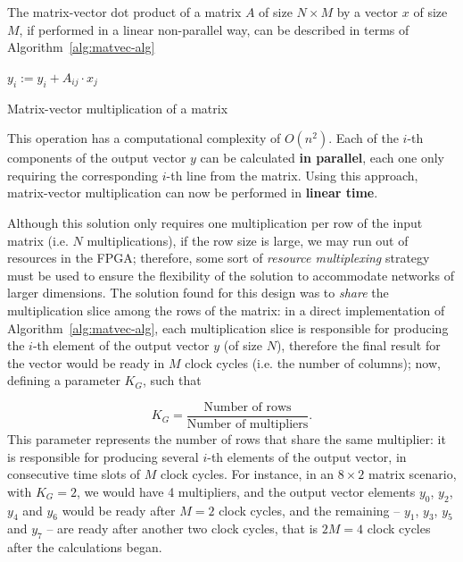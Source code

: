 \documentclass[conference]{IEEEtran}
\begin{document}
The matrix-vector dot product of a matrix $A$ of size $N \times M$ by a vector $x$ of size $M$, if performed in a linear non-parallel way, can be described in terms of Algorithm~\ref{alg:matvec-alg}

\begin{algorithm}
\begin{algorithmic}
    \State $y_i := y_i + A_{ij} \cdot x_j$
    \EndFor
\EndFor
\end{algorithmic}
\caption{Matrix-vector multiplication of a matrix}
\label{alg:matvec-alg}
\end{algorithm}
This operation has a computational complexity of $O(n^2)$. Each of the $i$-th components of the output vector $y$ can be calculated \textbf{in parallel},
each one only requiring the corresponding $i$-th line from the matrix. Using this approach, matrix-vector multiplication can now be performed in \textbf{linear time}.

Although this solution only requires one multiplication per row of the input matrix (i.e. $N$ multiplications), if the row
size is large, we may run out of resources in the FPGA; therefore, some sort of \textit{resource multiplexing} strategy must
be used to ensure the flexibility of the solution to accommodate networks of larger dimensions. The solution found for this
design was to \emph{share} the multiplication slice among the rows of the matrix: in a direct implementation of Algorithm~\ref{alg:matvec-alg},
each multiplication slice is responsible for producing the $i$-th element of the output vector $y$ (of size $N$), therefore the final
result for the vector would be ready in $M$ clock cycles (i.e. the number of columns); now, defining a
parameter $K_G$, such that

\begin{equation}\label{eq:kg}
K_G = \frac{\text{Number of rows}}{\text{Number of multipliers}}.
\end{equation}
This parameter represents the number of rows that share the same multiplier: it is responsible for producing several $i$-th elements of the output vector, in consecutive time slots of $M$ clock cycles.
For instance, in an $8\times2$ matrix scenario, with $K_G = 2$, we would have 4 multipliers, and the output vector
elements $y_0$, $y_2$, $y_4$ and $y_6$ would be ready after $M=2$ clock cycles, and the remaining -- $y_1$, $y_3$, $y_5$ and $y_7$ --  are
ready after another two clock cycles, that is $2M = 4$ clock cycles after the calculations began.
\end{document}
